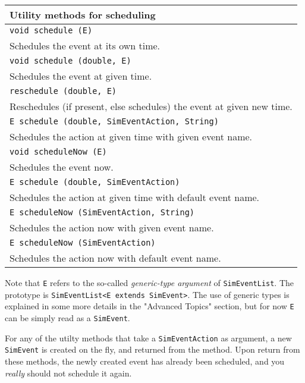 \begin{tabular}{|l|}
  \hline
  {\bf Utility methods for scheduling} \\
  \hline
  \lstinline[basicstyle=\footnotesize]!void schedule (E)! \\
    Schedules the event at its own time.\\
  \hline
  \lstinline[basicstyle=\footnotesize]!void schedule (double, E)! \\
    Schedules the event at given time.\\
  \hline
  \lstinline[basicstyle=\footnotesize]!reschedule (double, E)! \\
    Reschedules (if present, else schedules) the event at given new time.\\
  \hline
  \lstinline[basicstyle=\footnotesize]!E schedule (double, SimEventAction, String)! \\
    Schedules the action at given time with given event name.\\
  \hline
  \lstinline[basicstyle=\footnotesize]!void scheduleNow (E)! \\
    Schedules the event now.\\
  \hline
  \lstinline[basicstyle=\footnotesize]!E schedule (double, SimEventAction)! \\
    Schedules the action at given time with default event name.\\
  \hline
  \lstinline[basicstyle=\footnotesize]!E scheduleNow (SimEventAction, String)! \\
    Schedules the action now with given event name.\\
  \hline
  \lstinline[basicstyle=\footnotesize]!E scheduleNow (SimEventAction)! \\
    Schedules the action now with default event name.\\
  \hline
\end{tabular}

Note that \lstinline{E} refers to the so-called {\em generic-type argument\/}
  of \lstinline{SimEventList}.
The prototype is \lstinline!SimEventList<E extends SimEvent>!.
The use of generic types is explained in some more details in the "Advanced Topics" section,
  but for now \lstinline!E! can be simply read as a \lstinline{SimEvent}.

For any of the utilty methods that take a \lstinline{SimEventAction}
  as argument, a new \lstinline{SimEvent} is created on the fly,
  and returned from the method.
Upon return from these methods,
  the newly created event has already been scheduled,
  and you {\em really\/} should not schedule it again.

